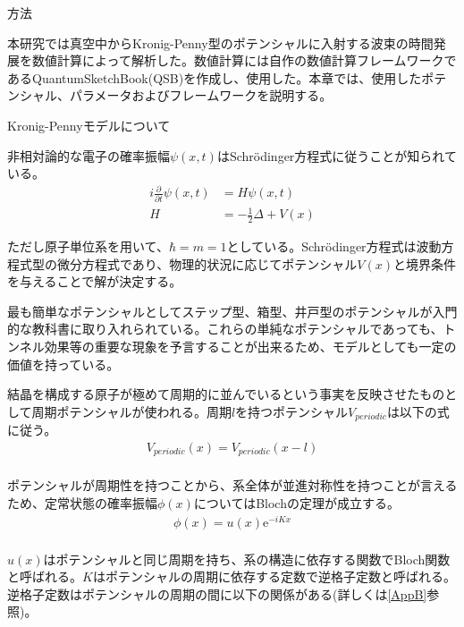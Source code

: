 \documentclass[a4paper, lualatex]{bxjsarticle}
\begin{document}
\begin{section}{方法}
    \par 本研究では真空中からKronig-Penny型のポテンシャルに入射する波束の時間発展を数値計算によって解析した。数値計算には自作の数値計算フレームワークであるQuantumSketchBook(QSB)\cite{QSB}を作成し、使用した。本章では、使用したポテンシャル、パラメータおよびフレームワークを説明する。
    \begin{subsection}{Kronig-Pennyモデルについて}
        \par 非相対論的な電子の確率振幅$\psi(x,t)$はSchrödinger方程式に従うことが知られている\cite{Koide}。
        \begin{align}
         i \frac{\partial}{\partial t}\psi(x, t) &= H \psi(x, t)\nonumber\\
             H &= -\frac{1}{2}\Delta + V(x)
        \end{align}
        \par ただし原子単位系を用いて、$\hbar=m=1$としている。Schrödinger方程式は波動方程式型の微分方程式であり、物理的状況に応じてポテンシャル$V(x)$と境界条件を与えることで解が決定する。
        \par 最も簡単なポテンシャルとしてステップ型、箱型、井戸型のポテンシャルが入門的な教科書\cite{Koide}に取り入れられている。これらの単純なポテンシャルであっても、トンネル効果等の重要な現象を予言することが出来るため、モデルとしても一定の価値を持っている。
        \par 結晶を構成する原子が極めて周期的に並んでいるという事実を反映させたものとして周期ポテンシャルが使われる。周期$l$を持つポテンシャル$V_{periodic}$は以下の式に従う。
        \begin{align}
         V_{periodic}(x)=V_{periodic}(x-l)\nonumber\\
        \end{align}
        \par ポテンシャルが周期性を持つことから、系全体が並進対称性を持つことが言えるため、定常状態の確率振幅$\phi(x)$についてはBlochの定理\cite{Bloch}が成立する。
            \begin{align}
             \phi(x)=u(x)\mathrm{e}^{-iKx}\nonumber\\
            \end{align}
        \par $u(x)$はポテンシャルと同じ周期を持ち、系の構造に依存する関数でBloch関数と呼ばれる。$K$はポテンシャルの周期に依存する定数で逆格子定数と呼ばれる。逆格子定数はポテンシャルの周期の間に以下の関係がある(詳しくは\ref{AppB}参照)。
        \begin{align}

\end{align}
\end{subsection}
\end{section}
\end{document}
